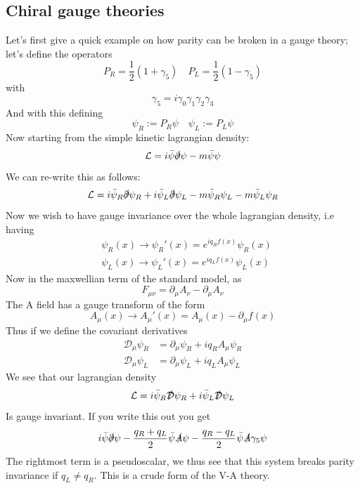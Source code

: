\documentclass[11pt,a4paper,faculty=we,language=en,doctype=report]{cls/ugent-doc}
\begin{document}
\subsection{Chiral gauge theories}
Let's first give a quick example on how parity can be broken in a gauge theory; let's define the operators
\begin{equation}
	P_R = \frac{1}{2}(1+\gamma_5)\quad P_L = \frac{1}{2}(1-\gamma_5)
\end{equation}
with
\begin{equation}
	\gamma_5 = i\gamma_0\gamma_1\gamma_2\gamma_3
\end{equation}
And with this defining 
\begin{equation}
	\psi_R := P_R\psi \quad \psi_L := P_L\psi
\end{equation}
Now starting from the simple kinetic lagrangian density:
\begin{equation}
  \mathcal{L} = i\bar{\psi}\slashed{\partial}\psi - m\bar{\psi}\psi
\end{equation}
We can re-write this as follows:
\begin{equation}
  \mathcal{L} = i\bar{\psi}_R\slashed{\partial}\psi_R + i\bar{\psi}_L\slashed{\partial}\psi_L - m\bar{\psi}_R\psi_L - m\bar{\psi}_L\psi_R
\end{equation}
Now we wish to have gauge invariance over the whole lagrangian density, 
i.e having
\begin{align}
  &\psi_R(x) \rightarrow \psi_R'(x) = e^{iq_R f(x)}\psi_R(x)\\
  &\psi_L(x) \rightarrow \psi_L'(x) = e^{iq_L f(x)}\psi_L(x)
\end{align}
Now in the maxwellian term of the standard model, as 
\begin{equation}
  F_{\mu\nu} = \partial_\mu A_\nu - \partial_\mu A_\nu
\end{equation}
The A field has a gauge transform of the form
\begin{equation}
	A_\mu(x) \rightarrow A_\mu'(x) = A_\mu(x) - \partial_\mu f(x) \label{eqn:U(1) gauge transform}
\end{equation}
Thus if we define the covariant derivatives
\begin{align}
  \mathcal{D}_\mu\psi_R &= \partial_\mu\psi_R + iq_RA_\mu\psi_R\\
  \mathcal{D}_\mu\psi_L &= \partial_\mu\psi_L + iq_LA_\mu\psi_L
\end{align}
We see that our lagrangian density
\begin{equation}
  \mathcal{L} = i\bar{\psi}_R\slashed{\mathcal{D}}\psi_R + i\bar{\psi}_L\slashed{\mathcal{D}}\psi_L
\end{equation}
Is gauge invariant. If you write this out you get
\begin{equation}
  i\bar{\psi}\slashed{\partial}\psi - \frac{q_R + q_L}{2}\bar{\psi}\slashed{A}\psi - \frac{q_R - q_L}{2}\bar{\psi}\slashed{A}\gamma_5\psi
\end{equation}
The rightmost term is a pseudoscalar, we thus see that this system breaks
parity invariance if $ q_L \neq q_R$. This is a crude form of the V-A theory.
\end{document}
